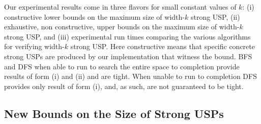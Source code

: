\documentclass[11pt]{article}
\begin{document}
Our experimental results come in three flavors for small constant
values of $k$: (i) constructive lower bounds on the maximum size of
width-$k$ strong USP, (ii) exhaustive, non constructive, upper bounds
on the maximum size of width-$k$ strong USP, and (iii) experimental
run times comparing the various algorithms for verifying width-$k$
strong USP.  Here constructive means that specific concrete strong
USPs are produced by our implementation that witness the bound.
\textsc{BFS} and \textsc{DFS} when able to run to search the entire
space to completion provide results of form (i) and (ii) and are
tight.  When unable to run to completion \textsc{DFS} provides only
result of form (i), and, as such, are not guaranteed to be tight.

\subsection{New Bounds on the Size of Strong USPs}
\label{subsec:usps_found}
\end{document}
